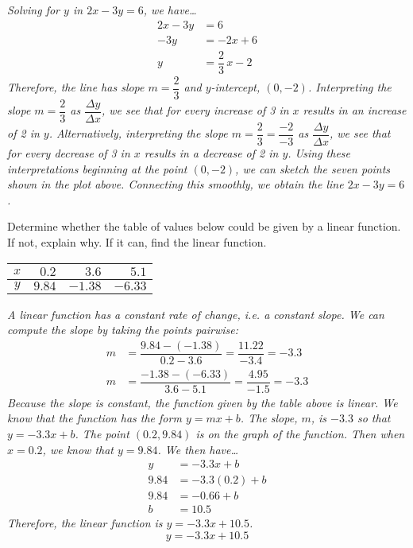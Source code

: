 \documentclass[12pt,letterpaper]{exam}
\begin{document}
\begin{questions}
{\noindent \itshape Solving for $y$ in $2x - 3y= 6$, we have\dots
	\[
	\begin{aligned}
	2x - 3y&= 6 \\[0.3cm]
	-3y&= -2x + 6 \\[0.3cm]
	y&= \dfrac{2}{3}\,x - 2
	\end{aligned}
	\]
Therefore, the line has slope $m= \dfrac{2}{3}$ and $y$-intercept, $(0, -2)$. Interpreting the slope $m= \dfrac{2}{3}$ as $\dfrac{\Delta y}{\Delta x}$, we see that for every increase of 3 in $x$ results in an increase of 2 in $y$. Alternatively, interpreting the slope $m= \dfrac{2}{3}= \dfrac{-2}{-3}$ as $\dfrac{\Delta y}{\Delta x}$, we see that for every decrease of 3 in $x$ results in a decrease of 2 in $y$. Using these interpretations beginning at the point $(0, -2)$, we can sketch the seven points shown in the plot above. Connecting this smoothly, we obtain the line $2x - 3y= 6$. 
}



\newpage
\question[10] Determine whether the table of values below could be given by a linear function. If not, explain why. If it can, find the linear function.
        \begin{table}[!ht]
        \centering
        \begin{tabular}{|c || r | r | r |} \hline
	$x$ & $0.2$ & $3.6$ & $5.1$ \\ \hline
	$y$ & $9.84$ & $-1.38$ & $-6.33$ \\ \hline
        \end{tabular}
        \end{table} \pspace

{\noindent \itshape A linear function has a constant rate of change, i.e. a constant slope. We can compute the slope by taking the points pairwise:
	\[
	\begin{aligned}
	m&= \dfrac{9.84 - (-1.38)}{0.2 - 3.6}= \dfrac{11.22}{-3.4}= -3.3 \\[0.3cm]
	m&= \dfrac{-1.38 - (-6.33)}{3.6 - 5.1}= \dfrac{4.95}{-1.5}= -3.3
	\end{aligned}
	\]
Because the slope is constant, the function given by the table above is linear. We know that the function has the form $y= mx + b$. The slope, $m$, is $-3.3$ so that $y= -3.3x + b$. The point $(0.2, 9.84)$ is on the graph of the function. Then when $x= 0.2$, we know that $y= 9.84$. We then have\dots
	\[
	\begin{aligned}
	y&= -3.3x + b \\[0.3cm]
	9.84&= -3.3(0.2) + b \\[0.3cm]
	9.84&= -0.66 + b \\[0.3cm]
	b&= 10.5
	\end{aligned}
	\]
Therefore, the linear function is $y= -3.3x + 10.5$. 
	\[
	\boxed{y= -3.3x + 10.5}
	\]
}




\end{questions}
\end{document}
